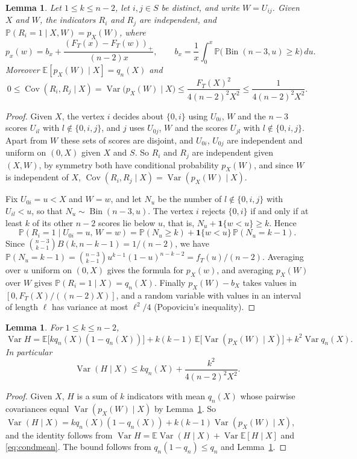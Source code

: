 \documentclass[11pt]{amsart}
\newtheorem{lemma}[theorem]{Lemma}
\theoremstyle{remark}
\numberwithin{equation}{section}
\newcommand{\E}{\mathbb E}
\newcommand{\Pp}{\mathbb P}
\newcommand{\1}{\mathbf 1}
\newcommand{\Var}{\operatorname{Var}}
\newcommand{\Cov}{\operatorname{Cov}}
\newcommand{\Bin}{\operatorname{Bin}}
\begin{document}
\begin{lemma}\label{lem:cov}
Let $1\le k\le n-2$, let $i,j\in S$ be distinct, and write $W=U_{ij}$. Given $X$ and $W$, the indicators $R_i$ and $R_j$ are independent, and $\Pp(R_i=1\mid X,W)=p_X(W)$, where
\[
p_x(w)=b_x+\frac{(F_T(x)-F_T(w))_+}{(n-2)x},\qquad b_x=\frac1x\int_0^x\Pp\bigl(\Bin(n-3,u)\ge k\bigr)\,du.
\]
Moreover $\E[p_X(W)\mid X]=q_n(X)$ and
\[
0\le\Cov(R_i,R_j\mid X)=\Var\bigl(p_X(W)\mid X\bigr)\le\frac{F_T(X)^2}{4(n-2)^2X^2}\le\frac1{4(n-2)^2X^2}.
\]
\end{lemma}

\begin{proof}
Given $X$, the vertex $i$ decides about $\{0,i\}$ using $U_{0i}$, $W$ and the $n-3$ scores $U_{il}$ with $l\notin\{0,i,j\}$, and $j$ uses $U_{0j}$, $W$ and the scores $U_{jl}$ with $l\notin\{0,i,j\}$. Apart from $W$ these sets of scores are disjoint, and $U_{0i}$, $U_{0j}$ are independent and uniform on $(0,X)$ given $X$ and $S$. So $R_i$ and $R_j$ are independent given $(X,W)$, by symmetry both have conditional probability $p_X(W)$, and since $W$ is independent of $X$, $\Cov(R_i,R_j\mid X)=\Var(p_X(W)\mid X)$.

Fix $U_{0i}=u<X$ and $W=w$, and let $N_u$ be the number of $l\notin\{0,i,j\}$ with $U_{il}<u$, so that $N_u\sim\Bin(n-3,u)$. The vertex $i$ rejects $\{0,i\}$ if and only if at least $k$ of its other $n-2$ scores lie below $u$, that is, $N_u+\1\{w<u\}\ge k$. Hence
\[
\Pp(R_i=1\mid U_{0i}=u,\,W=w)=\Pp(N_u\ge k)+\1\{w<u\}\,\Pp(N_u=k-1).
\]
Since $\binom{n-3}{k-1}B(k,n-k-1)=1/(n-2)$, we have $\Pp(N_u=k-1)=\binom{n-3}{k-1}u^{k-1}(1-u)^{n-k-2}=f_T(u)/(n-2)$. Averaging over $u$ uniform on $(0,X)$ gives the formula for $p_X(w)$, and averaging $p_X(W)$ over $W$ gives $\Pp(R_i=1\mid X)=q_n(X)$. Finally $p_X(W)-b_X$ takes values in $[0,F_T(X)/((n-2)X)]$, and a random variable with values in an interval of length $\ell$ has variance at most $\ell^2/4$ (Popoviciu's inequality).
\end{proof}

\begin{lemma}\label{lem:var}
For $1\le k\le n-2$,
\[
\Var H=\E\bigl[kq_n(X)(1-q_n(X))\bigr]+k(k-1)\,\E\bigl[\Var(p_X(W)\mid X)\bigr]+k^2\Var q_n(X).
\]
In particular
\begin{equation}\label{eq:varbound}
\Var(H\mid X)\le kq_n(X)+\frac{k^2}{4(n-2)^2X^2}.
\end{equation}
\end{lemma}

\begin{proof}
Given $X$, $H$ is a sum of $k$ indicators with mean $q_n(X)$ whose pairwise covariances equal $\Var(p_X(W)\mid X)$ by Lemma~\ref{lem:cov}. So $\Var(H\mid X)=kq_n(X)(1-q_n(X))+k(k-1)\Var(p_X(W)\mid X)$, and the identity follows from $\Var H=\E\Var(H\mid X)+\Var\E[H\mid X]$ and \eqref{eq:condmean}. The bound follows from $q_n(1-q_n)\le q_n$ and Lemma~\ref{lem:cov}.
\end{proof}
\end{document}
